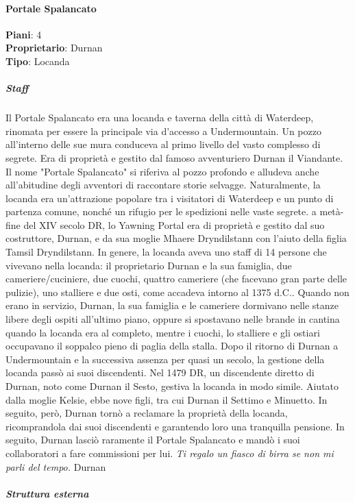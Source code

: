 \documentclass{article}
\begin{document}
\paragraph{Portale Spalancato}
\textbf{Piani}: 4 \\
\textbf{Proprietario}: Durnan \\
\textbf{Tipo}: Locanda \\
\subparagraph{Staff}
Il Portale Spalancato era una locanda e taverna della città di Waterdeep, rinomata per essere la principale via d'accesso a Undermountain. Un pozzo all'interno delle sue mura conduceva al primo livello del vasto complesso di segrete. Era di proprietà e gestito dal famoso avventuriero Durnan il Viandante. 
Il nome "Portale Spalancato" si riferiva al pozzo profondo e alludeva anche all'abitudine degli avventori di raccontare storie selvagge.
Naturalmente, la locanda era un'attrazione popolare tra i visitatori di Waterdeep e un punto di partenza comune, nonché un rifugio per le spedizioni nelle vaste segrete.
a metà-fine del XIV secolo DR, lo Yawning Portal era di proprietà e gestito dal suo costruttore, Durnan, e da sua moglie Mhaere Dryndilstann con l'aiuto della figlia Tamsil Dryndilstann. In genere, la locanda aveva uno staff di 14 persone che vivevano nella locanda: il proprietario Durnan e la sua famiglia, due cameriere/cuciniere, due cuochi, quattro cameriere (che facevano gran parte delle pulizie), uno stalliere e due osti, come accadeva intorno al 1375 d.C.. Quando non erano in servizio, Durnan, la sua famiglia e le cameriere dormivano nelle stanze libere degli ospiti all'ultimo piano, oppure si spostavano nelle brande in cantina quando la locanda era al completo, mentre i cuochi, lo stalliere e gli ostiari occupavano il soppalco pieno di paglia della stalla.
Dopo il ritorno di Durnan a Undermountain e la successiva assenza per quasi un secolo, la gestione della locanda passò ai suoi discendenti. Nel 1479 DR, un discendente diretto di Durnan, noto come Durnan il Sesto, gestiva la locanda in modo simile. Aiutato dalla moglie Kelsie, ebbe nove figli, tra cui Durnan il Settimo e Minuetto. In seguito, però, Durnan tornò a reclamare la proprietà della locanda, ricomprandola dai suoi discendenti e garantendo loro una tranquilla pensione. In seguito, Durnan lasciò raramente il Portale Spalancato e mandò i suoi collaboratori a fare commissioni per lui.
\textit{Ti regalo un fiasco di birra se non mi parli del tempo.} Durnan
\subparagraph{Struttura esterna}
\end{document}
